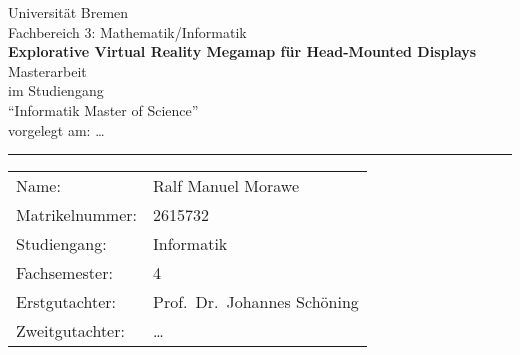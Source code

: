 \begin{titlepage}
\begin{center}
    \LARGE Universität Bremen\\
    \large Fachbereich 3: Mathematik/Informatik\\
    \vspace{2cm}
    \LARGE\textsf{\textbf{Explorative Virtual Reality Megamap für Head-Mounted Displays}} \\
    \vspace{2cm}
    \LARGE Masterarbeit\\
    \vspace{0.5cm}
    \large
    im Studiengang\\
    \enquote{Informatik Master of Science}\\
    \vspace{1cm}
    \normalsize
    vorgelegt am: \dots \\
    \vspace{3.5cm}
\end{center}
\vfill
\noindent
\hrule
\vspace{1em}
\begin{tabular}{ll}
    Name: & {Ralf Manuel Morawe} \\
    Matrikelnummer: & {2615732} \\
    Studiengang: & Informatik\\
    Fachsemester: & 4\\
    Erstgutachter: & {Prof.\ Dr.\ Johannes Schöning} \\
    Zweitgutachter: & {\dots}
\end{tabular}
\end{titlepage}
\cleardoublepage
